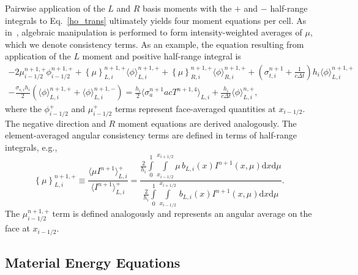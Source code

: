 \documentclass[12pt]{article}
\renewcommand{\d}{\mathrm{d}}
\newcommand{\mom}[1]{\langle #1 \rangle}
\newcommand{\cur}[1]{\left\{ #1 \right\}}
\newcommand{\xl}{{x_{i-1/2}}}
\newcommand{\xr}{{x_{i+1/2}}}
\newcommand{\il}{{i-1/2}}
\begin{document}
\begin{center}
Pairwise application of the $L$ and $R$ basis
moments with the $+$ and $-$ half-range integrals to Eq.~\eqref{ho_trans} 
ultimately yields four moment
equations per cell. As in~\cite{wolters}, algebraic manipulation is performed to form
intensity-weighted
averages of $\mu$, which we denote consistency terms.  As an example, the equation resulting from application of the $L$ moment and
positive half-range integral is
\begin{multline}\label{lo_tran}
    -2{\mu}_{i-1/2}^{n+1,+} \phi_{i-1/2}^{n+1,+} + \cur {\mu}_{L,i}^{n+1,+}
  \mom{\phi}_{L,i}^{n+1,+}
  +  \cur\mu_{R,i}^{n+1,+}
  \mom{\phi}_{R,i}^{n+1,+} +  \left(\sigma_{t,i}^{n+1}+\frac{1}{c \Delta t} \right) h_i 
  \mom{\phi}_{L,i}^{n+1,+} \\-  \frac{\sigma_{s,i} h_i}{2} \left( \mom{\phi}_{L,i}^{n+1,+} +
  \mom\phi_{L,i}^{n+1,-}\right) = \frac{h_i}{2} \mom{\sigma_a^{n+1} a c T^{n+1,4}}_{L,i} +
  \frac{h_i}{c\Delta t}\mom{\phi}_{L,i}^{n,+},
\end{multline}
where the $\phi^+_{i-1/2}$ and $\mu^+_{i-1/2}$ terms represent face-averaged quantities at $x_{\il}$.  The negative direction and $R$ moment equations are
derived analogously.  The element-averaged angular consistency terms are defined in terms of half-range integrals, e.g.,
\begin{equation}\label{const}
    \cur{{\mu}}_{L,i}^{n+1,+} \equiv \frac{\mom{\mu I^{n+1}}_{L,i}^+}{\mom{I^{n+1}}_{L,i}^+} =  \frac{
{\displaystyle \frac{2}{h_i}} \int\limits_0^1 \int\limits_\xl^\xr \mu \, b_{L,i}(x)
I^{n+1}(x,\mu) \d x \d \mu } 
{{\displaystyle \frac{2}{h_i}} \int\limits_0^1 \int\limits_\xl^\xr \, b_{L,i}(x)
I^{n+1}(x,\mu) \d x \d \mu } .
\end{equation}
The $\mu_{i-1/2}^{n+1,+}$ term is defined analogously and represents an angular average on the face at $x_{\il}$.

\subsection{Material Energy Equations}


\end{center}
\end{document}
